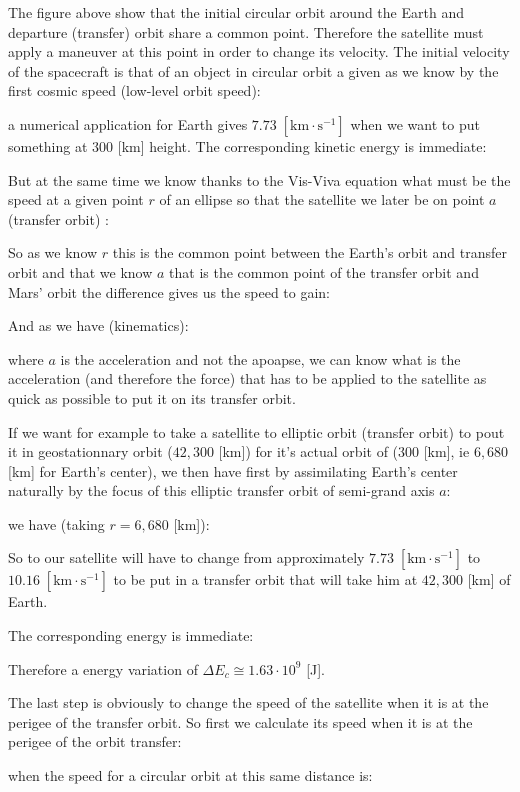 	The figure above show that the initial circular orbit around the Earth and departure (transfer) orbit share a common point. Therefore the satellite must apply a maneuver at this point in order to change its velocity. The initial velocity of the spacecraft is that of an object in circular orbit a given as we know by the first cosmic speed (low-level orbit speed):
	
	
	a numerical application for Earth gives $7.73\;[\text{km}\cdot\text{s}^{-1}]$ when we want to put something at $300$ [km] height. The corresponding kinetic energy is immediate:
	
	
	But at the same time we know thanks to the Vis-Viva equation what must be the speed at a given point $r$ of an ellipse so that the satellite we later be on point $a$ (transfer orbit) :
	
	So as we know $r$ this is the common point between the Earth's orbit and transfer orbit and that we know $a$ that is the common point of the transfer orbit and Mars' orbit the difference gives us the speed to gain:
	
	And as we have (kinematics):
	
	where $a$ is the acceleration and not the apoapse, we can know what is the acceleration (and therefore the force) that has to be applied to the satellite as quick as possible to put it on its transfer orbit.
	
	If we want for example to take a satellite to elliptic orbit (transfer orbit) to pout it in geostationnary orbit ($42,300$ [km]) for it's actual orbit of ($300$ [km], ie $6,680$ [km] for Earth's center), we then have first by assimilating Earth's center naturally by the focus of this elliptic transfer orbit of semi-grand axis $a$:
	
	we have (taking $r=6,680$ [km]):
	
	So to our satellite will have to change from approximately $7.73\;[\text{km}\cdot \text{s}^{-1}]$ to $10.16\;[\text{km}\cdot \text{s}^{-1}]$ to be put in a transfer orbit that will take him at $42,300$ [km] of Earth.
	
	The corresponding energy is immediate:
	
	Therefore a energy variation of $\Delta E_c\cong 1.63\cdot 10^9$ [J].
	
	The last step is obviously to change the speed of the satellite when it is at the perigee of the transfer orbit. So first we calculate its speed when it is at the perigee of the orbit transfer:
	
	when the speed for a circular orbit at this same distance is:
	
